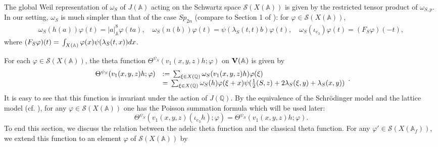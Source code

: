 \documentclass[11pt]{amsart}
\numberwithin{equation}{section}
\theoremstyle{definition}
\begin{document}
The global Weil representation of $\omega_S$ of $J({\mathbb{A}})$ acting on the Schwartz space $\mathcal{S}(X({\mathbb{A}}))$ is given by the restricted tensor product of $\omega_{S,p}$. 
In our setting, $\omega_S$ is much simpler than that of the case $Sp_{2n}$ (compare to Section 1 of \cite{Ik1}): 
for $\varphi\in \mathcal{S}(X({\mathbb{A}}))$,  
$$\begin{array}{c}
\omega_{S}(h(a))\varphi(t)=|a|^8_{\mathbb{A}}\varphi(ta),\quad
\omega_{S}(n(b))\varphi(t)=\psi(\lambda_S(t,t)b)\varphi(t),\quad
\omega_{S}(\iota_{e_3})\varphi(t)=(F_S\varphi)(-t),
\end{array}
$$
where $(F_S\varphi)(t)={\displaystyle}\int_{X({\mathbb{A}})} \varphi(x)\psi(\lambda_S(t,x))dx$. 

For each $\varphi\in \mathcal{S}(X({\mathbb{A}}))$, the theta function $\Theta^{\psi_S}(v_1(x,y,z)h;\varphi)$ on $\bold V({\mathbb{A}})$ is given by 
$$\begin{array}{rl}
\Theta^{\psi_S}(v_1(x,y,z)h;\varphi)&:={\displaystyle}\sum_{\xi\in X({\mathbb{Q}})}\omega_S(v_1(x,y,z)h)\varphi(\xi)\\
&={\displaystyle}\sum_{\xi\in X({\mathbb{Q}})}\omega_S(h)\varphi(\xi+x)\psi(\frac{1}{2}(S,z)+2\lambda_S(\xi,y)+\lambda_S(x,y))
\end{array}.
$$
It is easy to see that this function is invariant under the action of $J({\mathbb{Q}})$. 
By the equivalence of the Schr\"odinger model and the lattice model (cf. \cite{takase}), for any $\varphi \in \mathcal{S}(X({\mathbb{A}}))$ one has 
the Poisson summation formula which will be used later:
\begin{equation}\label{poisson}
\Theta^{\psi_S}(v_1(x,y,z)(\iota_{e_3} h);\varphi)=\Theta^{\psi_S}(v_1(x,y,z)h;\varphi).
\end{equation}
To end this section, we discuss the relation between the adelic theta function and the classical theta function. 
For any $\varphi' \in \mathcal{S}(X({\mathbb{A}}_f))$, we extend this function to an element $\varphi$ of 
$\mathcal{S}(X({\mathbb{A}}))$ by
\end{document}
